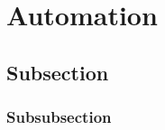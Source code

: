 
%
%

\section{Automation}
\label{sec:automation}





\subsection{Subsection}
\label{subsec:automation_subsection}



\subsubsection{Subsubsection}
\label{subsubsec:automation_subsubsection}




